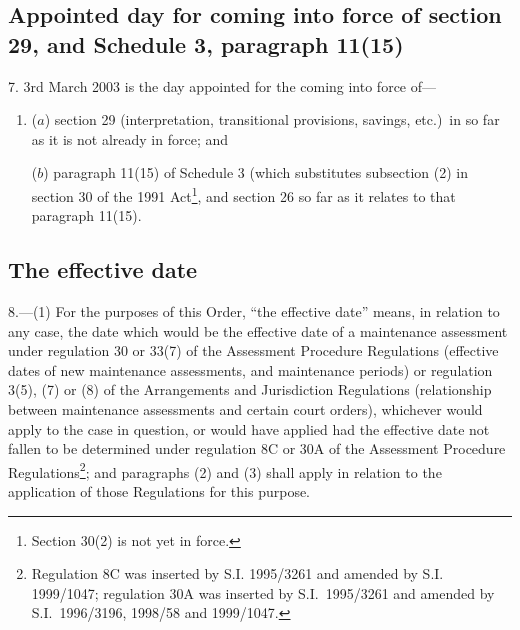 \documentclass[12pt,a4paper]{article}
\begin{document}
\subsection[7. Appointed day for coming into force of section 29, and Schedule 3, paragraph 11(15)]{Appointed day for coming into force of section 29, and Schedule 3, paragraph 11(15)}

7.  3rd March 2003 is the day appointed for the coming into force of—
\begin{enumerate}\item[]
($a$) section 29 (interpretation, transitional provisions, savings, etc.)\ in so far as it is not already in force; and

($b$) paragraph 11(15) of Schedule 3 (which substitutes subsection (2) in section 30 of the 1991 Act\footnote{Section 30(2) is not yet in force.}, and section 26 so far as it relates to that paragraph 11(15).
\end{enumerate}

\subsection[8. The effective date]{The effective date}

8.---(1)  For the purposes of this Order, “the effective date” means, in relation to any case, the date which would be the effective date of a maintenance assessment under regulation 30 or 33(7) of the Assessment Procedure Regulations (effective dates of new maintenance assessments, and maintenance periods) or regulation 3(5), (7) or (8) of the Arrangements and Jurisdiction Regulations (relationship between maintenance assessments and certain court orders), whichever would apply to the case in question, or would have applied had the effective date not fallen to be determined under regulation 8C or 30A of the Assessment Procedure Regulations\footnote{Regulation 8C was inserted by S.I. 1995/3261 and amended by S.I. 1999/1047; regulation 30A was inserted by S.I.\ 1995/3261 and amended by S.I.\ 1996/3196, 1998/58 and 1999/1047.}; and paragraphs (2) and (3) shall apply in relation to the application of those Regulations for this purpose.
\end{document}
